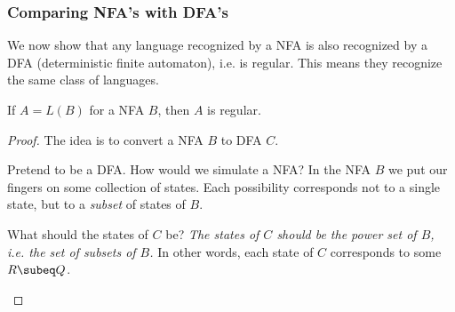 \subsubsection{Comparing NFA's with DFA's}
We now show that any language recognized by a NFA is also recognized by a DFA (deterministic finite automaton), i.e. is regular. This means they recognize the same class of languages.
\begin{thm}
If $A=L(B)$ for a NFA $B$, then $A$ is regular.
\end{thm}
\begin{proof}
The idea is to convert a NFA $B$ to DFA $C$. %

Pretend to be a DFA. How would we simulate a NFA? In the NFA $B$ we put our fingers on some collection of states. Each possibility corresponds not to a single state, but to a {\it subset} of states of $B$.

What should the states of $C$ be? \emph{The states of $C$ should be the power set of $B$, i.e. the set of subsets of $B$.} %
In other words, each state of $C$ corresponds to some $R\subeq Q$.

\begin{center}

\end{center}


\end{proof}
